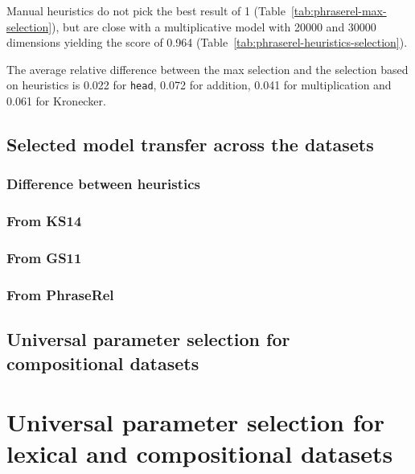 Manual heuristics do not pick the best result of 1 (Table~\ref{tab:phraserel-max-selection}), but are close with a multiplicative model with 20000 and 30000 dimensions yielding the score of 0.964 (Table~\ref{tab:phraserel-heuristics-selection}).

The average relative difference between the max selection and the selection based on heuristics is 0.022 for \texttt{head}, 0.072 for addition, 0.041 for multiplication and 0.061 for Kronecker.

\section{Selected model transfer across the datasets}
\label{sec:select-model-transf-comp}

\subsection{Difference between heuristics}
\label{sec:diff-betw-heur-comp}

\subsection{From KS14}
\label{sec:from-ks14}

\subsection{From GS11}
\label{sec:from-gs11}

\subsection{From PhraseRel}
\label{sec:from-phraserel}



\section{Universal parameter selection for compositional datasets}
\label{sec:robust-param-comp-selecion}

\chapter{Universal parameter selection for lexical and compositional datasets}
\label{sec:universal-param-selection}






